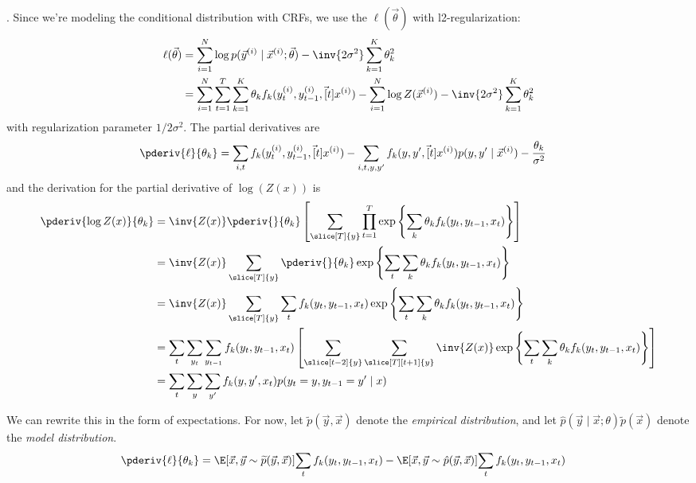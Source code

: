 \documentclass[11pt]{article}
\begin{document}
\myspace{}
\myspace

\p {}. Since we're modeling the conditional distribution with CRFs, we use the  $\ell(\vec{\theta})$ with l2-regularization:
\begin{align}
\ell(\vec{\theta}) &= \sum_{i = 1}^{N} \log p(\vec{y}^{(i)} \mid \vec{x}^{(i)} ; \vec{\theta}) - \inv{2\sigma^2}\sum_{k = 1}^{K} \theta_k^2 \\
&= \sum_{i = 1}^{N}\sum_{t = 1}^{T}\sum_{k = 1}^{K} \theta_k f_k(y_t^{(i)}, y_{t-1}^{(i)}, \vec[t]{x}^{(i)}) - \sum_{i = 1}^{N} \log Z(\vec{x}^{(i)})  - \inv{2\sigma^2}\sum_{k = 1}^{K} \theta_k^2
\end{align}
with regularization parameter $1/2\sigma^2$. The partial derivatives are 
\begin{align}
\pderiv{\ell}{\theta_k} &= \sum_{i,t} f_k(y_t^{(i)}, y_{t-1}^{(i)}, \vec[t]{x}^{(i)})
- \sum_{i,t,y,y'} f_k(y, y', \vec[t]{x}^{(i)}) p(y, y' \mid \vec{x}^{(i)})
- \frac{\theta_k}{\sigma^2}
\end{align}
and the derivation for the partial derivative of $\log(Z(x))$ is
\begin{align}
\pderiv{\log Z(x)}{\theta_k} 
&= \inv{Z(x)} \pderiv{}{\theta_k} \left[ \sum_{\slice[T]{y}} \prod_{t = 1}^{T} \exp\left\{ \sum_k \theta_k f_k(y_t, y_{t-1}, x_t)  \right\}  \right] 
\\
&= \inv{Z(x)} \sum_{\slice[T]{y}} \pderiv{}{\theta_k}  \exp\left\{ \sum_t \sum_k \theta_k f_k(y_t, y_{t-1}, x_t)  \right\}
\\
&= \inv{Z(x)} \sum_{\slice[T]{y}} \sum_t f_k(y_t, y_{t-1}, x_t)  \exp\left\{ \sum_t \sum_k \theta_k f_k(y_t, y_{t-1}, x_t)  \right\}  
\\
&= \sum_t \sum_{y_t} \sum_{y_{t-1}} f_k(y_t, y_{t-1}, x_t) \left[ \sum_{\slice[t-2]{y}} \sum_{\slice[T][t+1]{y}} \inv{Z(x)}  \exp\left\{ \sum_t \sum_k \theta_k f_k(y_t, y_{t-1}, x_t)  \right\}  \right] 
\\
&= \sum_t \sum_{y} \sum_{y'} f_k(y, y', x_t) p(y_t=y, y_{t-1}=y' \mid x)
\end{align}

We can rewrite this in the form of expectations. For now, let $\widetilde{p}(\vec y, \vec x)$ denote the \textit{empirical distribution}, and let $\hat{p}(\vec y \mid \vec x; \theta)\widetilde{p}(\vec x)$ denote the \textit{model distribution}.
\begin{align}
\pderiv{\ell}{\theta_k}
&= \E[\vec{x},\vec{y} \sim \widetilde{p}(\vec{y},\vec{x})]{\sum_t f_k(y_t, y_{t-1}, x_t)}
- \E[\vec{x}, \vec y \sim \hat{p}(\vec y, \vec x)]{\sum_t f_k(y_t, y_{t-1}, x_t)}
\end{align}
\end{document}
